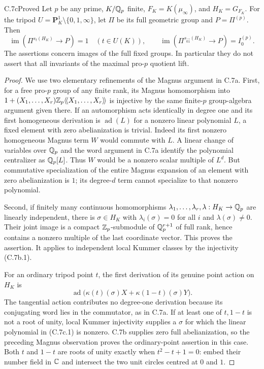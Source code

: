 \begin{claim}{C.7c}{Proved}
Let $p$ be any prime, $K/\mathbb Q_p$ finite, $F_K=K(\mu_\infty)$, and
$H_K=G_{F_K}$. For the tripod $U=\mathbf P^1_K\setminus\{0,1,\infty\}$,
let $\Pi$ be its full geometric group and $P=\Pi^{(p)}$. Then
\[
 \operatorname{im}(\Pi^{s_t(H_K)}\longrightarrow P)=1
       \quad(t\in U(K)),\qquad
 \operatorname{im}(\Pi^{s_{\overrightarrow{01}}(H_K)}
                    \longrightarrow P)=I_0^{(p)}.
\]
The assertions concern images of the full fixed groups. In particular they
do not assert that all invariants of the maximal pro-$p$ quotient lift.
\end{claim}
\begin{proof}
We use two elementary refinements of the Magnus argument in C.7a. First,
for a free pro-$p$ group of any finite rank, its Magnus homomorphism into
$1+(X_1,\ldots,X_r)\mathbb Z_p\langle\!\langle X_1,\ldots,X_r\rangle\!\rangle$
is injective by the same finite-$p$ group-algebra argument given there.
If an automorphism acts identically in degree one and its first
homogeneous derivation is $\operatorname{ad}(L)$ for a nonzero linear
polynomial $L$, a fixed element with zero abelianization is trivial.
Indeed its first nonzero homogeneous Magnus term $W$ would commute with
$L$. A linear change of variables over $\mathbb Q_p$ and the word argument in
C.7a identify the polynomial centralizer as $\mathbb Q_p[L]$. Thus $W$ would be
a nonzero scalar multiple of $L^d$. But commutative specialization of the
entire Magnus expansion of an element with zero abelianization is $1$;
its degree-$d$ term cannot specialize to that nonzero polynomial.

Second, if finitely many continuous homomorphisms
$\lambda_1,\ldots,\lambda_r,\lambda:H_K\to\mathbb Q_p$ are linearly
independent, there is $\sigma\in H_K$ with
$\lambda_i(\sigma)=0$ for all $i$ and $\lambda(\sigma)\ne0$.
Their joint image is a compact $\mathbb Z_p$-submodule of $\mathbb Q_p^{r+1}$ of full
rank, hence contains a nonzero multiple of the last coordinate vector.
This proves the assertion. It applies to independent local Kummer
classes by the injectivity (C.7b.1).

For an ordinary tripod point $t$, the first derivation of its genuine
point action on $H_K$ is
\[
 \operatorname{ad}\bigl(\kappa(t)(\sigma)X+
                         \kappa(1-t)(\sigma)Y\bigr).           \tag{C.7c.1}
\]
The tangential action contributes no degree-one derivation because its
conjugating word lies in the commutator, as in C.7a. If at least one of
$t,1-t$ is not a root of unity, local Kummer injectivity supplies a
$\sigma$ for which the linear polynomial in (C.7c.1) is nonzero. C.7b
supplies zero full abelianization, so the preceding Magnus observation
proves the ordinary-point assertion in this case. Both $t$ and $1-t$
are roots of unity exactly when $t^2-t+1=0$: embed their number field in
$\mathbb C$ and intersect the two unit circles centred at $0$ and $1$.


\end{proof}
